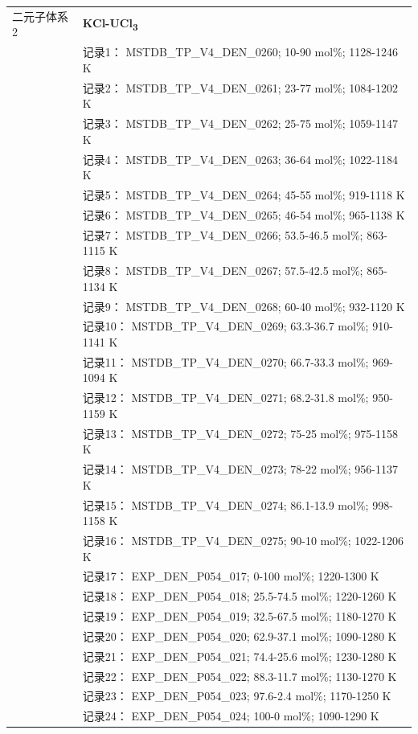 \documentclass[12pt]{article}
\begin{document}
{\begin{longtable}[]{@{}
  >{\raggedright\arraybackslash}p{}
  >{\raggedright\arraybackslash}p{}@{}}
二元子体系 2  & \textbf{KCl-UCl\textsubscript{3}} \\
 & 记录1： MSTDB\_TP\_V4\_DEN\_0260; 10-90 mol\%; 1128-1246 K \\
 & 记录2： MSTDB\_TP\_V4\_DEN\_0261; 23-77 mol\%; 1084-1202 K \\
 & 记录3： MSTDB\_TP\_V4\_DEN\_0262; 25-75 mol\%; 1059-1147 K \\
 & 记录4： MSTDB\_TP\_V4\_DEN\_0263; 36-64 mol\%; 1022-1184 K \\
 & 记录5： MSTDB\_TP\_V4\_DEN\_0264; 45-55 mol\%; 919-1118 K \\
 & 记录6： MSTDB\_TP\_V4\_DEN\_0265; 46-54 mol\%; 965-1138 K \\
 & 记录7： MSTDB\_TP\_V4\_DEN\_0266; 53.5-46.5 mol\%; 863-1115 K \\
 & 记录8： MSTDB\_TP\_V4\_DEN\_0267; 57.5-42.5 mol\%; 865-1134 K \\
 & 记录9： MSTDB\_TP\_V4\_DEN\_0268; 60-40 mol\%; 932-1120 K \\
 & 记录10： MSTDB\_TP\_V4\_DEN\_0269; 63.3-36.7 mol\%; 910-1141 K \\
 & 记录11： MSTDB\_TP\_V4\_DEN\_0270; 66.7-33.3 mol\%; 969-1094 K \\
 & 记录12： MSTDB\_TP\_V4\_DEN\_0271; 68.2-31.8 mol\%; 950-1159 K \\
 & 记录13： MSTDB\_TP\_V4\_DEN\_0272; 75-25 mol\%; 975-1158 K \\
 & 记录14： MSTDB\_TP\_V4\_DEN\_0273; 78-22 mol\%; 956-1137 K \\
 & 记录15： MSTDB\_TP\_V4\_DEN\_0274; 86.1-13.9 mol\%; 998-1158 K \\
 & 记录16： MSTDB\_TP\_V4\_DEN\_0275; 90-10 mol\%; 1022-1206 K \\
 & 记录17： EXP\_DEN\_P054\_017; 0-100 mol\%; 1220-1300 K \\
 & 记录18： EXP\_DEN\_P054\_018; 25.5-74.5 mol\%; 1220-1260 K \\
 & 记录19： EXP\_DEN\_P054\_019; 32.5-67.5 mol\%; 1180-1270 K \\
 & 记录20： EXP\_DEN\_P054\_020; 62.9-37.1 mol\%; 1090-1280 K \\
 & 记录21： EXP\_DEN\_P054\_021; 74.4-25.6 mol\%; 1230-1280 K \\
 & 记录22： EXP\_DEN\_P054\_022; 88.3-11.7 mol\%; 1130-1270 K \\
 & 记录23： EXP\_DEN\_P054\_023; 97.6-2.4 mol\%; 1170-1250 K \\
 & 记录24： EXP\_DEN\_P054\_024; 100-0 mol\%; 1090-1290 K  \\


\end{longtable}}
\end{document}
